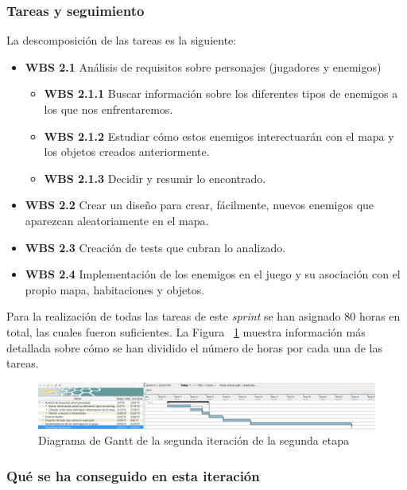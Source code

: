 \subsubsection{Tareas y seguimiento}

La descomposición de las tareas es la siguiente:

\begin{itemize}
  \item \textbf{WBS 2.1} Análisis de requisitos sobre personajes (jugadores y enemigos)
    \begin{itemize}
      \item \textbf{WBS 2.1.1} Buscar información sobre los diferentes tipos de enemigos a los que nos enfrentaremos.
      \item \textbf{WBS 2.1.2} Estudiar cómo estos enemigos interectuarán con el mapa y los objetos creados anteriormente.
      \item \textbf{WBS 2.1.3} Decidir y resumir lo encontrado.
    \end{itemize}
  \item \textbf{WBS 2.2} Crear un diseño para crear, fácilmente, nuevos enemigos que aparezcan aleatoriamente en el mapa.
  \item \textbf{WBS 2.3} Creación de tests que cubran lo analizado.
  \item \textbf{WBS 2.4} Implementación de los enemigos en el juego y su asociación con el propio mapa, habitaciones y objetos.
\end{itemize}

\noindent Para la realización de todas las tareas de este \textit{sprint} se han asignado 80 horas en total, las cuales fueron suficientes. La Figura ~\ref{fig:sec2it2} muestra información más detallada sobre cómo se han dividido el número de horas por cada una de las tareas.

\begin{figure}
    \includegraphics[width=\textwidth,height=\textheight,keepaspectratio]{./img/sec2it2.png}
  \caption{Diagrama de Gantt de la segunda iteración de la segunda etapa}
  \label{fig:sec2it2}
\end{figure}

\subsubsection{Qué se ha conseguido en esta iteración}

